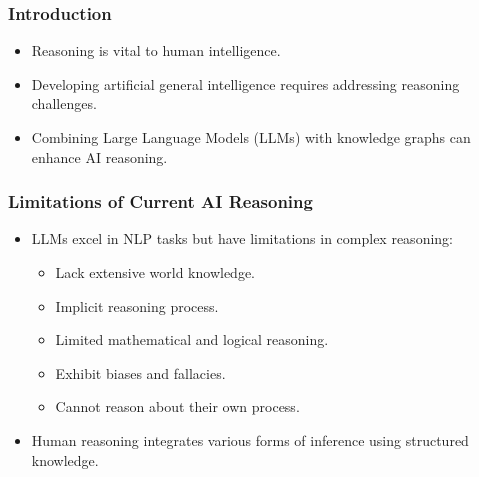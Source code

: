 \begin{frame}[fragile]\frametitle{Introduction}
    \begin{itemize}
        \item Reasoning is vital to human intelligence.
        \item Developing artificial general intelligence requires addressing reasoning challenges.
        \item Combining Large Language Models (LLMs) with knowledge graphs can enhance AI reasoning.
    \end{itemize}
\end{frame}

\begin{frame}[fragile]\frametitle{Limitations of Current AI Reasoning}
    \begin{itemize}
        \item LLMs excel in NLP tasks but have limitations in complex reasoning:
        \begin{itemize}
            \item Lack extensive world knowledge.
            \item Implicit reasoning process.
            \item Limited mathematical and logical reasoning.
            \item Exhibit biases and fallacies.
            \item Cannot reason about their own process.
        \end{itemize}
        \item Human reasoning integrates various forms of inference using structured knowledge.
    \end{itemize}
\end{frame}

